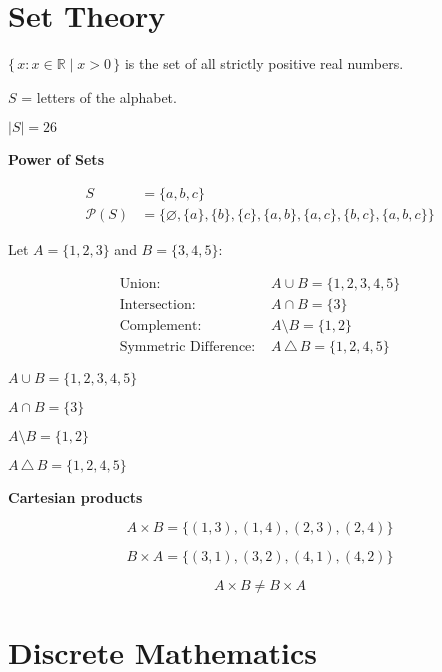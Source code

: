 \section{Set Theory}

$\{\, x : x \in \mathbb{R} \mid x > 0 \,\}$ is the set of all strictly positive real numbers.

$S$ = letters of the alphabet.

$|S| = 26$

\textbf{Power of Sets}

\begin{align*}
S &= \{a, b, c\} \\
\mathcal{P}(S) &= \{\varnothing, \{a\}, \{b\}, \{c\}, \{a,b\}, \{a,c\}, \{b,c\}, \{a,b,c\}\}
\end{align*}

Let $A = \{1, 2, 3\}$ and $B = \{3, 4, 5\}$:

\begin{align*}
    \text{Union: } & A \cup B = \{1, 2, 3, 4, 5\} \\
    \text{Intersection: } & A \cap B = \{3\} \\
    \text{Complement: } & A \setminus B = \{1, 2\} \\
    \text{Symmetric Difference: } & A \,\triangle\, B = \{1, 2, 4, 5\}
\end{align*}

\begin{description}[leftmargin=!,align=right,labelwidth=11em]
  \item[Union] $A \cup B = \{1, 2, 3, 4, 5\}$
  \item[Intersection] $A \cap B = \{3\}$
  \item[Complement] $A \setminus B = \{1, 2\}$
  \item[Symmetric Difference] $A \,\triangle\, B = \{1, 2, 4, 5\}$
\end{description}

\textbf{Cartesian products}

\[
A \times B = \{(1,3), (1,4), (2,3), (2,4)\}
\]

\[
B \times A = \{(3,1), (3,2), (4,1), (4,2)\}
\]

\[
A \times B \neq B \times A
\]

\newpage

\section{Discrete Mathematics}


